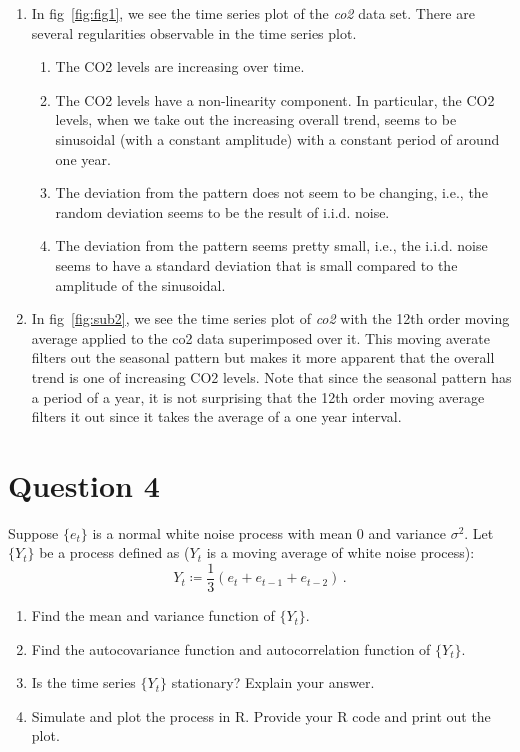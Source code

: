 \documentclass[10pt]{fphw}
\begin{document}
\begin{enumerate}   
\item In fig~\ref{fig:fig1}, we see the time series plot of the \emph{co2} data set.
There are several regularities observable in the time series plot.
\begin{enumerate}
    \item The CO2 levels are increasing over time.
    \item The CO2 levels have a non-linearity component. In particular, the CO2 levels, when we take out the increasing overall trend,
    seems to be sinusoidal (with a constant amplitude) with a constant period of around one year.
    \item The deviation from the pattern does not seem to be changing, i.e., the random deviation seems to be the result of i.i.d. noise.
    \item The deviation from the pattern seems pretty small, i.e., the i.i.d. noise seems to have a standard deviation that is small compared to the amplitude of the sinusoidal.
\end{enumerate}

\item In fig~\ref{fig:sub2}, we see the time series plot of \emph{co2} with the 12th order moving average applied to the co2 data superimposed over it.
This moving averate filters out the seasonal pattern but makes it more apparent that the overall trend is one of increasing CO2 levels.
Note that since the seasonal pattern has a period of a year, it is not surprising that the 12th order moving average filters it out since it takes the average of a one year interval.
\end{enumerate}

\section*{Question 4}
\begin{problem}
Suppose $\{e_t\}$ is a normal white noise process with mean $0$ and variance $\sigma^2$.
Let $\{Y_t\}$ be a
process defined as ($Y_t$ is a moving average of white noise process):
\begin{equation}
Y_t \coloneqq \frac{1}{3}(e_{t} + e_{t-1} + e_{t-2})\,.
\end{equation}

\begin{enumerate}
\item Find the mean and variance function of $\{Y_t\}$.
\item Find the autocovariance function and autocorrelation function of $\{Y_t\}$.
\item Is the time series $\{Y_t\}$ stationary? Explain your answer.
\item Simulate and plot the process in R. Provide your R code and print out the plot.
\end{enumerate}
\end{problem}
\end{document}

